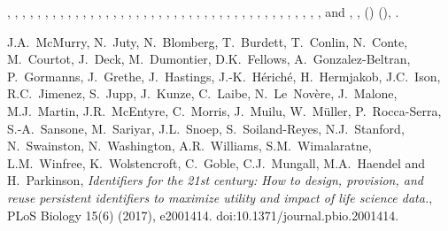 \documentclass[ds,v1.1.2,openaccess]{iosart2x}%
\begin{document}
\begin{thebibliography}{}
%
\begin{barticle}
,
,
,
,
,
,
,
,
,
,
,
,
,
,
,
,
,
,
,
,
,
,
,
,
,
,
,
,
,
,
,
,
,
,
,
,
,
,
,
,
,
,
 and
,
,
()
(),
.
\end{barticle}
%
\OrigBibText
J.A.~{McMurry},
N.~Juty,
N.~Blomberg,
T.~Burdett,
T.~Conlin,
N.~Conte,
M.~Courtot,
J.~Deck,
M.~Dumontier,
D.K.~Fellows,
A.~Gonzalez-Beltran,
P.~Gormanns,
J.~Grethe,
J.~Hastings,
J.-K.~H\'{e}rich\'{e},
H.~Hermjakob,
J.C.~Ison,
R.C.~Jimenez,
S.~Jupp,
J.~Kunze,
C.~Laibe,
N.~Le~Nov\`{e}re,
J.~Malone,
M.J.~Martin,
J.R.~{McEntyre},
C.~Morris,
J.~Muilu,
W.~M\"{u}ller,
P.~Rocca-Serra,
S.-A.~Sansone,
M.~Sariyar,
J.L.~Snoep,
S.~Soiland-Reyes,
N.J.~Stanford,
N.~Swainston,
N.~Washington,
A.R.~Williams,
S.M.~Wimalaratne,
L.M.~Winfree,
K.~Wolstencroft,
C.~Goble,
C.J.~Mungall,
M.A.~Haendel and
H.~Parkinson,
\textit{Identifiers for the 21st century: How to design, provision, and reuse
persistent identifiers to maximize utility and impact of life science data.},
{PLoS} Biology
15(6)
(2017),
e2001414.
doi:10.1371/journal.pbio.2001414.
\endOrigBibText
{}
\endbibitem


\end{thebibliography}
\end{document}
